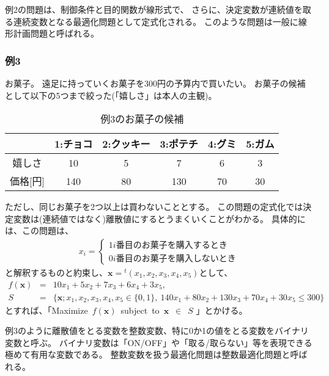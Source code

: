 \documentclass[12pt]{jarticle}
\begin{document}
例2の問題は、制御条件と目的関数が線形式で、
さらに、決定変数が連続値を取る連続変数となる最適化問題として定式化される。
このような問題は一般に線形計画問題と呼ばれる。

\subsubsection*{例3}
お菓子。
遠足に持っていくお菓子を300円の予算内で買いたい。
お菓子の候補として以下の5つまで絞った(「嬉しさ」は本人の主観)。

\begin{table}[htb]
    \begin{center}
        \caption{例3のお菓子の候補}
        \begin{tabular}{|c|c|c|c|c|c|}
            \hline
                     & 1:チョコ & 2:クッキー & 3:ポテチ & 4:グミ & 5:ガム \\
            \hline
            嬉しさ   & 10       & 5          & 7        & 6      & 3      \\
            価格[円] & 140      & 80         & 130      & 70     & 30     \\
            \hline
        \end{tabular}
    \end{center}
\end{table}
ただし、同じお菓子を2つ以上は買わないこととする。
この問題の定式化では決定変数は(連続値ではなく)離散値にするとうまくいくことがわかる。
具体的には、この問題は、
\begin{eqnarray}
    x_i=\left\{
    \begin{array}{l}
        1　i番目のお菓子を購入するとき \\
        0　i番目のお菓子を購入しないとき
    \end{array}
    \right. \nonumber
\end{eqnarray}
と解釈するものと約束し、$\boldsymbol{x}={}^t(x_1,x_2,x_3,x_4,x_5)$として、
\begin{eqnarray}
    f(\boldsymbol{x})&=&10x_1+5x_2+7x_3+6x_4+3x_5, \nonumber \\
    S&=&\{ \boldsymbol{x};x_1,x_2,x_3,x_4,x_5 \in \{0,1\},\ 140x_1+80x_2+130x_3+70x_4+30x_5\leq 300\}\nonumber
\end{eqnarray}
とすれば、「Maximize\ $f(\boldsymbol{x})$\ subject\ to\ $\boldsymbol{x}$\ $\in$\ $S$ 」とかける。



例3のように離散値をとる変数を整数変数、特に0か1の値をとる変数をバイナリ変数と呼ぶ。
バイナリ変数は「ON/OFF」や「取る/取らない」等を表現できる極めて有用な変数である。
整数変数を扱う最適化問題は整数最適化問題と呼ばれる。
\end{document}
